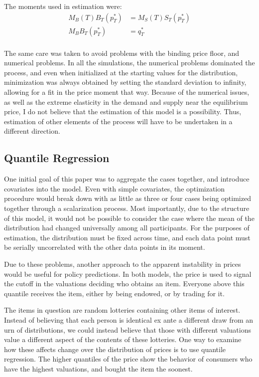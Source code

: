\documentclass[12pt, letterpaper]{paper}
\begin{document}
The moments used in estimation were:
\begin{align*}
M_B(T) B_T(p_T^* ) &= M_S(T) S_T(p_T^* )\\
M_B B_T(p_T^* ) &= q_T^*\\
\end{align*}

The same care was taken to avoid problems with the binding price
floor, and numerical problems. In all the simulations, the
numerical problems dominated the process, and even when initialized at
the starting values for the distribution, minimization was always
obtained by setting the standard deviation to infinity, allowing for a
fit in the price moment that way. Because of the numerical issues, as
well as the extreme elasticity in the demand and supply near the
equilibrium price, I do not believe that the estimation of this model
is a possibility. Thus, estimation of other elements of the
process will have to be undertaken in a different direction.


\subsection{Quantile Regression}
\label{sec-4-6}

One initial goal of this paper was to aggregate the cases together,
and introduce covariates into the model. Even with simple
covariates, the optimization procedure would break down with as little
as three or four cases being optimized together through a
scalarization process. Most importantly, due to the structure of this
model, it would not be possible to consider the case where the mean of
the distribution had changed universally among all participants. For
the purposes of estimation, the distribution must be fixed across
time, and each data point must be serially uncorrelated with the other
data points in its moment.

Due to these problems, another approach to the apparent
instability in prices would be useful for policy predictions. In
both models, the price is used to signal the cutoff in the valuations
deciding who obtains an item. Everyone above this quantile receives
the item, either by being endowed, or by trading for it. 

The items in question are random lotteries containing other items of
interest. Instead of believing that each person is identical ex ante
a different draw from an urn of distributions, we could instead
believe that those with different valuations value a different aspect
of the contents of these lotteries. One way to examine how these
affects change over the distribution of prices is to use quantile
regression. The higher quantiles of the price show the behavior of
consumers who have the highest valuations, and bought the item the
soonest. 
\end{document}
